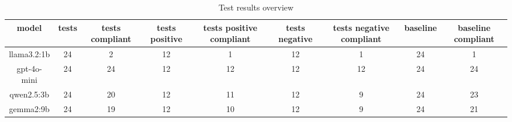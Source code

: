 
  \begin{table}[h!]
  \centering
  \begin{tabular}{|c|c|c|c|c|c|c|c|c|}
  \hline
  model & tests & tests compliant & tests positive & tests positive compliant & tests negative & tests negative compliant & baseline & baseline compliant \\
  \hline
  llama3.2:1b & 24 & 2 & 12 & 1 & 12 & 1 & 24 & 1\\
\hline
gpt-4o-mini & 24 & 24 & 12 & 12 & 12 & 12 & 24 & 24\\
\hline
qwen2.5:3b & 24 & 20 & 12 & 11 & 12 & 9 & 24 & 23\\
\hline
gemma2:9b & 24 & 19 & 12 & 10 & 12 & 9 & 24 & 21
  \end{tabular}
  \caption{Test results overview}
  
  \end{table}
  